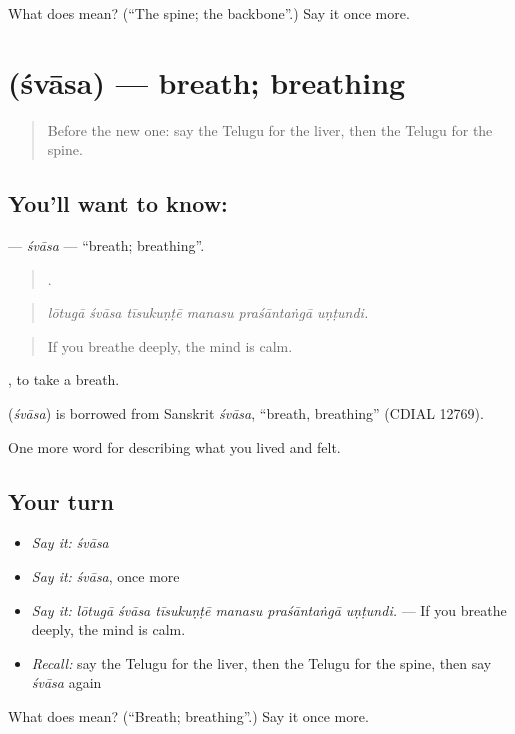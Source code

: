 \begin{tcolorbox}[breakable,colback=teal!4,colframe=teal!35!black,title={Before you move on}]
What does  mean? (\textquotedblleft{}The spine; the backbone\textquotedblright{}.) Say it once more.
\end{tcolorbox}
\section[\texorpdfstring{\te{శ్వాస} (śvāsa)}{శ్వాస (śvāsa)}]{ (śvāsa) — breath; breathing}

\label{lesson:TE-C515-svasa}



\begin{quote}
Before the new one: say the Telugu for the liver, then the Telugu for the spine.
\end{quote}

\subsection*{You'll want to know: }
\textbf{} — \emph{śvāsa} — \textquotedblleft{}breath; breathing\textquotedblright{}.

\begin{quote}
     .
\end{quote}

\begin{quote}
\emph{lōtugā śvāsa tīsukuṇṭē manasu praśāntaṅgā uṇṭundi.}
\end{quote}

\begin{quote}
If you breathe deeply, the mind is calm.
\end{quote}

 , to take a breath.

\begin{cousinweb}
\textbf{} (\emph{śvāsa}) is borrowed from Sanskrit \emph{śvāsa}, \textquotedblleft{}breath, breathing\textquotedblright{} (CDIAL 12769).
\end{cousinweb}

\begin{grammarlens}[title={What you've built}]
One more word for describing what you lived and felt.
\end{grammarlens}

\subsection*{Your turn}
\begin{itemize}
\raggedright
  \item \emph{Say it:} \emph{śvāsa}
  \item \emph{Say it:} \emph{śvāsa}, once more
  \item \emph{Say it:} \emph{lōtugā śvāsa tīsukuṇṭē manasu praśāntaṅgā uṇṭundi.} — If you breathe deeply, the mind is calm.
  \item \emph{Recall:} say the Telugu for the liver, then the Telugu for the spine, then say \emph{śvāsa} again
\end{itemize}

\begin{tcolorbox}[breakable,colback=teal!4,colframe=teal!35!black,title={Before you move on}]
What does  mean? (\textquotedblleft{}Breath; breathing\textquotedblright{}.) Say it once more.
\end{tcolorbox}
